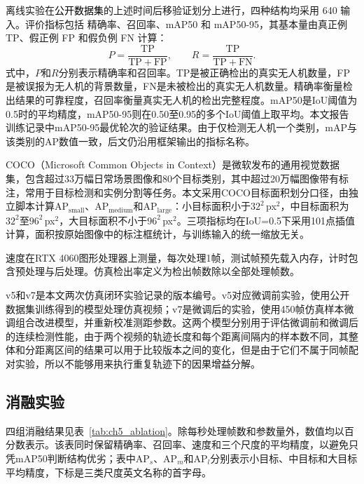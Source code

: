 离线实验在\textcolor{black}{公开数据集}的上述时间后移验证划分上进行，四种结构均采用 640 输入。评价指标包括 精确率、召回率、mAP50 和 mAP50-95，其基本量由真正例 TP、假正例 FP 和假负例 FN 计算：
\begin{equation}
P=\frac{\mathrm{TP}}{\mathrm{TP}+\mathrm{FP}},\qquad
R=\frac{\mathrm{TP}}{\mathrm{TP}+\mathrm{FN}}.
\label{eq:ch5_pr}
\end{equation}
式中，$P$和$R$分别表示精确率和召回率。TP是被正确检出的真实无人机数量，FP是被误报为无人机的背景数量，FN是未被检出的真实无人机数量。精确率衡量检出结果的可靠程度，召回率衡量真实无人机的检出完整程度。mAP50是IoU阈值为0.5时的平均精度，mAP50-95则在0.50至0.95的多个IoU阈值上取平均。本文报告训练记录中mAP50-95最优轮次的验证结果。由于仅检测无人机一个类别，mAP与该类别的AP数值一致，后文仍沿用框架输出的指标名称。

COCO（Microsoft Common Objects in Context）是微软发布的通用视觉数据集，包含超过33万幅日常场景图像和80个目标类别，其中超过20万幅图像带有标注，常用于目标检测和实例分割等任务。本文采用COCO目标面积划分口径，由独立脚本计算AP$_{\mathrm{small}}$、AP$_{\mathrm{medium}}$和AP$_{\mathrm{large}}$：小目标面积小于$32^2$\,px$^2$，中目标面积为$32^2$至$96^2$\,px$^2$，大目标面积不小于$96^2$\,px$^2$。三项指标均在IoU=0.5下采用101点插值计算，面积按原始图像中的标注框统计，与训练输入的统一缩放无关。

速度在RTX 4060图形处理器上测量，每次处理1帧，测试帧预先载入内存，计时包含预处理与后处理。仿真检出率定义为检出帧数除以全部处理帧数。

v5和v7是本文两次仿真闭环实验记录的版本编号。v5对应微调前实验，使用公开数据集训练得到的模型处理仿真视频；v7是微调后的实验，使用450帧仿真样本微调组合改进模型，并重新校准测距参数。这两个模型分别用于评估微调前和微调后的连续检测性能，由于两个视频的轨迹长度和每个距离间隔内的样本数不同，其整体和分距离区间的结果可以用于比较版本之间的变化，但是由于它们不属于同帧配对实验，所以不能够用来执行重复轨迹下的因果增益分解。

\subsection{消融实验}
\label{subsec:ch5_ablation}

四组消融结果见表~\ref{tab:ch5_ablation}。除每秒处理帧数和参数量外，数值均以百分数表示。该表同时保留精确率、召回率、速度和三个尺度的平均精度，以避免只凭mAP50判断结构优劣；表中AP$_{s}$、AP$_{m}$和AP$_{l}$分别表示小目标、中目标和大目标平均精度，下标是三类尺度英文名称的首字母。

